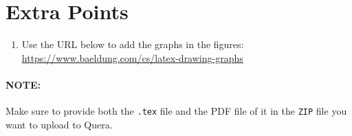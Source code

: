 \documentclass[titlepage]{article}
\begin{document}
\section{Extra Points}
\begin{enumerate}
    \item Use the URL below to add the graphs in the figures:
        \url{https://www.baeldung.com/cs/latex-drawing-graphs}
\end{enumerate}

\paragraph{NOTE:}
Make sure to provide both the \texttt{.tex} file and the PDF file of it in the \texttt{ZIP}
file you want to upload to Quera.
\end{document}
